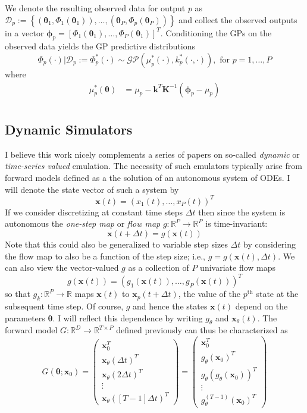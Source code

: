 \documentclass[12pt]{article}
\newcommand{\R}{\mathbb{R}}
\newcommand{\btheta}{\boldsymbol{\theta}}
\newcommand{\bx}{\mathbf{x}}
\begin{document}
We denote the resulting observed data for output $p$ as 
$\mathcal{D}_p := \left\{(\btheta_1, \Phi_1(\btheta_1)), \dots, (\btheta_P, \Phi_p(\btheta_P))  \right\}$ and collect the observed outputs in a vector 
$\boldsymbol{\phi}_p = \left[\Phi_1(\btheta_1), \dots, \Phi_P(\btheta_1) \right]^T$. Conditioning the GPs on the observed data yields the GP predictive distributions 
\[\Phi_p(\cdot)|\mathcal{D}_p := \Phi_p^*(\cdot) \sim \mathcal{GP}(\mu^*_p(\cdot), k_p^*(\cdot, \cdot)), \text{ for } p = 1, \dots, P\]
where 
\begin{align*}
\mu_p^*(\btheta) &= \mu_p  - \mathbf{k}^T \mathbf{K}^{-1} \left(\boldsymbol{\phi}_p - \mu_p \right) \\
\end{align*}

\subsection{Dynamic Simulators}
I believe this work nicely complements a series of papers on so-called \textit{dynamic} or \textit{time-series valued} emulation. The necessity of such emulators typically arise from forward models 
defined as a the solution of an autonomous system of ODEs. I will denote the state vector of such a system by 
\[\bx(t) = \left(x_1(t), \dots, x_P(t) \right)^T \]
If we consider discretizing at constant time steps $\Delta t$ then since the system is autonomous the \textit{one-step map} or \textit{flow map} $g: \R^P \to \R^P$ is time-invariant: 
 \[\bx(t + \Delta t) = g(\bx(t))\]
 Note that this could also be generalized to variable step sizes $\Delta t$ by considering the flow map to also be a function of the step size; i.e., $g = g(\bx(t), \Delta t)$. We can also view the 
 vector-valued $g$ as a collection of $P$ univariate flow maps
 \[g(\bx(t)) = \left(g_1(\bx(t)), \dots, g_P(\bx(t)) \right)^T\]
 so that $g_k: \R^P \to \R$ maps $\bx(t)$ to $\bx_p(t + \Delta t)$, the value of the $p^{\text{th}}$ state at the subsequent time step. Of course, $g$ and hence the states $\bx(t)$ depend on 
 the parameters $\btheta$. I will reflect this dependence by writing $g_\theta$ and $\bx_\theta(t)$. The forward model $G: \R^D \to \R^{T \times P}$ defined previously can thus be characterized 
 as 
 \[
 G(\btheta; \bx_0) = \begin{pmatrix} \bx_0^T \\ \bx_\theta(\Delta t)^T \\  \bx_\theta(2\Delta t)^T \\ \vdots \\ \bx_\theta\left([T-1]\Delta t\right)^T \end{pmatrix} = 
 \begin{pmatrix} \bx_0^T \\ g_\theta(\bx_0)^T \\  g_\theta\left(g_\theta(\bx_0)\right)^T \\ \vdots \\ g_\theta^{(T-1)}(\bx_0)^T \end{pmatrix}
 \]
\end{document}
